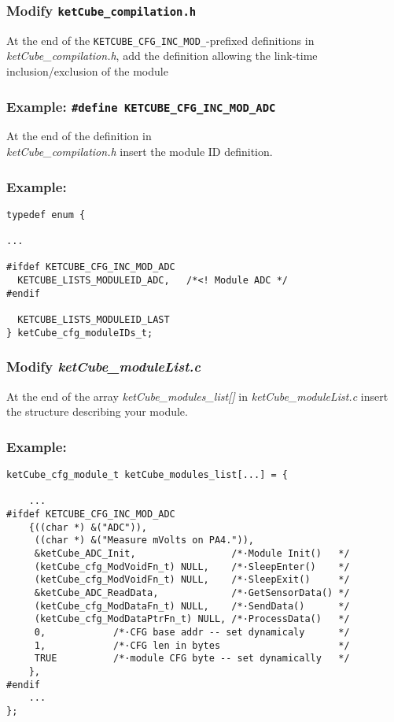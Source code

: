 \documentclass[twoside,a4paper]{refart}
\begin{document}
\subsubsection*{Modify {\tt ketCube\_compilation.h}}\label{sec:creation:core:cfg}

At the end of the {\tt KETCUBE\_CFG\_INC\_MOD\_}-prefixed definitions in\\{\it ketCube\_compilation.h}, add the definition allowing the link-time inclusion/exclusion of the module
\subsubsection*{Example: {\tt \#define KETCUBE\_CFG\_INC\_MOD\_ADC}}

At the end of the definition in\\{\it ketCube\_compilation.h} insert the module ID definition.
\subsubsection*{Example:}
\begin{verbatim}
typedef enum {

...

#ifdef KETCUBE_CFG_INC_MOD_ADC
  KETCUBE_LISTS_MODULEID_ADC,   /*<! Module ADC */
#endif

  KETCUBE_LISTS_MODULEID_LAST
} ketCube_cfg_moduleIDs_t;
\end{verbatim}

\subsubsection*{Modify {\it ketCube\_moduleList.c}}
At the end of the array {\it ketCube\_modules\_list[]} in {\it ketCube\_moduleList.c} insert the structure describing your module.
\subsubsection*{Example:}
\begin{verbatim}
ketCube_cfg_module_t ketCube_modules_list[...] = {
    
    ...
#ifdef KETCUBE_CFG_INC_MOD_ADC
    {((char *) &("ADC")),
     ((char *) &("Measure mVolts on PA4.")),
     &ketCube_ADC_Init,                 /*·Module Init()   */
     (ketCube_cfg_ModVoidFn_t) NULL,    /*·SleepEnter()    */
     (ketCube_cfg_ModVoidFn_t) NULL,    /*·SleepExit()     */
     &ketCube_ADC_ReadData,             /*·GetSensorData() */
     (ketCube_cfg_ModDataFn_t) NULL,    /*·SendData()      */
     (ketCube_cfg_ModDataPtrFn_t) NULL, /*·ProcessData()   */
     0,            /*·CFG base addr -- set dynamicaly      */
     1,            /*·CFG len in bytes                     */
     TRUE          /*·module CFG byte -- set dynamically   */
    },
#endif
    ...
};
\end{verbatim}
\end{document}
